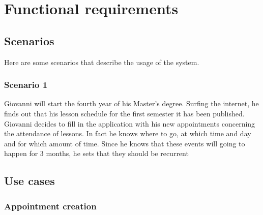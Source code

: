\section{Functional requirements}
\subsection{Scenarios}
Here are some scenarios that describe the usage of the system.
\subsubsection{Scenario 1} \label{scenario:1}
Giovanni will start the fourth year of his Master's degree. Surfing the internet, he finds out that his lesson schedule for the first semester it has been published. Giovanni decides to fill in the application with his new appointments concerning the attendance of lessons. In fact he knows where to go, at which time and day and for which amount of time. Since he knows that these events will going to happen for 3 months, he sets that they should be recurrent

\subsection{Use cases}


\subsubsection{Appointment creation} \label{usecase:appcreation}

